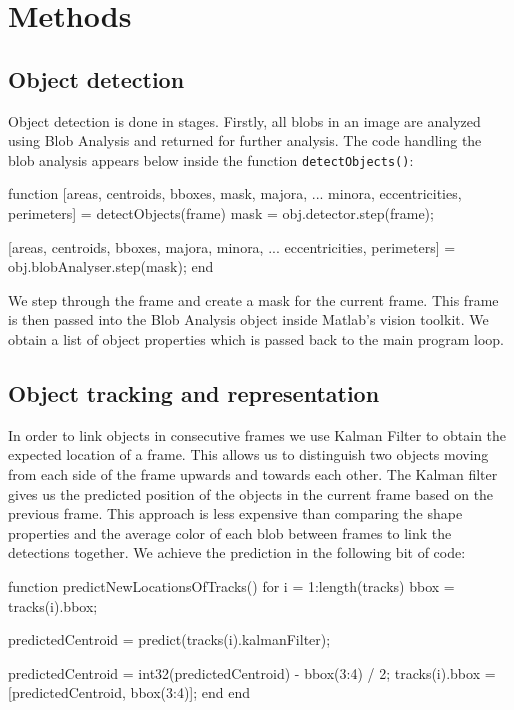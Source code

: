 \documentclass[10pt,a4paper]{article}
\begin{document}
\section{Methods}

\subsection{Object detection}
	
Object detection is done in stages. Firstly, all blobs in an image are analyzed using Blob Analysis and returned for further analysis. The code handling the blob analysis appears below inside the function \texttt{detectObjects()}:

\begin{verbatimtab}
function [areas, centroids, bboxes, mask, majora, ...
          minora, eccentricities, perimeters] = detectObjects(frame)
        mask = obj.detector.step(frame);

        [areas, centroids, bboxes, majora, minora, ...
        eccentricities, perimeters] = obj.blobAnalyser.step(mask);
    end
\end{verbatimtab}

We step through the frame and create a mask for the current frame. This frame is then passed into the Blob Analysis object inside Matlab's vision toolkit. We obtain a list of object properties which is passed back to the main program loop. 

\subsection{Object tracking and representation}

In order to link objects in consecutive frames we use Kalman Filter to obtain the expected location of a frame. This allows us to distinguish two objects moving from each side of the frame upwards and towards each other. The Kalman filter gives us the predicted position of the objects in the current frame based on the previous frame. This approach is less expensive than comparing the shape properties and the average color of each blob between frames to link the detections together. We achieve the prediction in the following bit of code:

\begin{samepage}
\begin{verbatimtab}
function predictNewLocationsOfTracks()
	for i = 1:length(tracks)
		bbox = tracks(i).bbox;

		predictedCentroid = predict(tracks(i).kalmanFilter);

		predictedCentroid = int32(predictedCentroid) - bbox(3:4) / 2;
		tracks(i).bbox = [predictedCentroid, bbox(3:4)];
	end
end
\end{verbatimtab}
\end{samepage}
\end{document}
